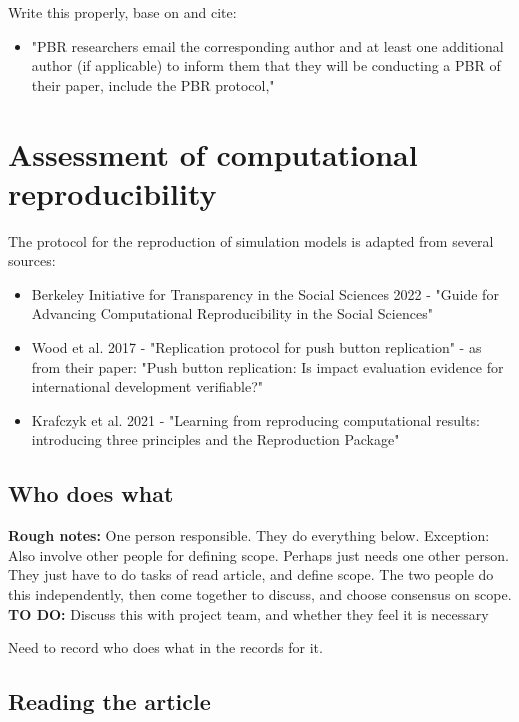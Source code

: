 Write this properly, base on and cite:
\begin{itemize}
    \item "PBR researchers email the corresponding author and at least one additional author (if applicable) to inform them that they will be conducting a PBR of their paper, include the PBR protocol,"\autocite{berkeley_initiative_for_transparency_in_the_social_sciences_guide_2022}
\end{itemize}

\section{Assessment of computational reproducibility}

The protocol for the reproduction of simulation models is adapted from several sources:
\begin{itemize}
    \item Berkeley Initiative for Transparency in the Social Sciences 2022 - "Guide for Advancing Computational Reproducibility in the Social Sciences"\autocite{berkeley_initiative_for_transparency_in_the_social_sciences_guide_2022}
    \item Wood et al. 2017 - "Replication protocol for push button replication"\autocite{wood_replication_2018} - as from their paper: "Push button replication: Is impact evaluation evidence for international development verifiable?"\autocite{wood_push_2018}
    \item Krafczyk et al. 2021 - "Learning from reproducing computational results: introducing three principles and the Reproduction Package"\autocite{krafczyk_learning_2021}
\end{itemize}

\subsection{Who does what}

\textbf{Rough notes:} One person responsible. They do everything below. Exception: Also involve other people for defining scope. Perhaps just needs one other person. They just have to do tasks of read article, and define scope. The two people do this independently, then come together to discuss, and choose consensus on scope. \textbf{TO DO:} Discuss this with project team, and whether they feel it is necessary

Need to record who does what in the records for it.

\subsection{Reading the article}

